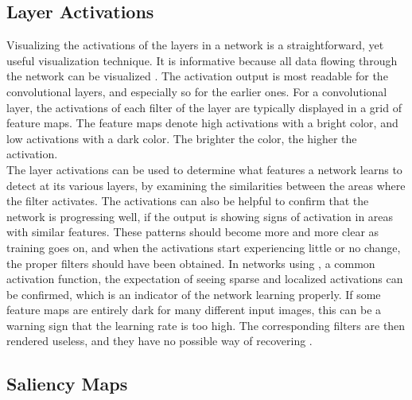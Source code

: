 \subsection{Layer Activations}

Visualizing the activations of the layers in a network is a straightforward, yet useful visualization technique. It is informative because all data flowing through the network can be visualized \cite{yosinski-deepvis}. The activation output is most readable for the convolutional layers, and especially so for the earlier ones. For a convolutional layer, the activations of each filter of the layer are typically displayed in a grid of feature maps. The feature maps denote high activations with a bright color, and low activations with a dark color. The brighter the color, the higher the activation. \\

\noindent The layer activations can be used to determine what features a network learns to detect at its various layers, by examining the similarities between the areas where the filter activates. The activations can also be helpful to confirm that the network is progressing well, if the output is showing signs of activation in areas with similar features. These patterns should become more and more clear as training goes on, and when the activations start experiencing little or no change, the proper filters should have been obtained. In networks using , a common activation function, the expectation of seeing sparse and localized activations can be confirmed, which is an indicator of the network learning properly. If some feature maps are entirely dark for many different input images, this can be a warning sign that the learning rate is too high. The corresponding filters are then rendered useless, and they have no possible way of recovering \cite{cs231n-act}.

\subsection{Saliency Maps}

